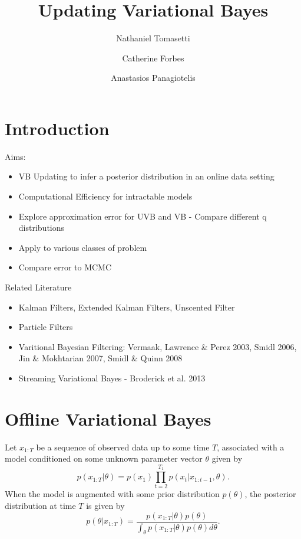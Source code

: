 \documentclass[12pt,a4paper]{article}\usepackage[]{graphicx}\usepackage[]{color}
\title{Updating Variational Bayes}
\author{Nathaniel Tomasetti 
\and Catherine Forbes
\and Anastasios Panagiotelis}
\begin{document}
\maketitle



\section{Introduction}
\label{sec:intro}

Aims:
\begin{itemize}
\item VB Updating to infer a posterior distribution in an online data setting
\item Computational Efficiency for intractable models
\item Explore approximation error for UVB and VB - Compare different q distributions
\item Apply to various classes of problem
\item Compare error to MCMC
\end{itemize}

Related Literature
\begin{itemize}
\item Kalman Filters, Extended Kalman Filters, Unscented Filter
\item Particle Filters
\item Varitional Bayesian Filtering: Vermaak, Lawrence \& Perez 2003, Smidl 2006, Jin \& Mokhtarian 2007, Smidl \& Quinn 2008
\item Streaming Variational Bayes - Broderick et al. 2013
\end{itemize}

\section{Offline Variational Bayes}
\label{sec:Inference}

Let $x_{1:T}$ be a sequence of observed data up to some time $T$, associated with a model conditioned on some unknown parameter vector $\theta$ given by
\begin{equation}
\label{likelihood}
p(x_{1:T} | \theta) = p(x_1) \prod_{t=2}^{T_1} p(x_t | x_{1:t-1}, \theta).
\end{equation}
When the model is augmented with some prior distribution $p(\theta)$, the posterior distribution at time $T$ is given by
\begin{equation}
\label{posterior}
p(\theta | x_{1:T}) = \frac{p(x_{1:T} | \theta)p(\theta)}{\int_{\theta}p(x_{1:T} | \theta)p(\theta)d\theta}.
\end{equation}
\\
\end{document}
